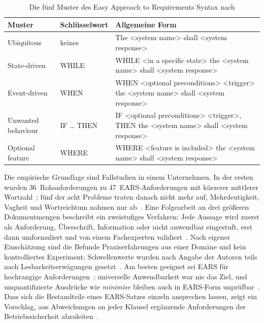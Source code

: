 \documentclass[11pt,a4paper]{report}
\begin{document}
\begin{table}[htbp]
  \centering
  \caption{Die fünf Muster des Easy Approach to Requirements Syntax
           nach \cite[Abschn.~4.2--4.6]{mavin2009ears}}
  \label{tab:ears-muster}
  \begin{tabular}{@{}>{\raggedright\arraybackslash}p{2.6cm}%
                    >{\raggedright\arraybackslash}p{2.0cm}%
                    >{\raggedright\arraybackslash}p{8.2cm}@{}}
    \toprule
    \textbf{Muster} & \textbf{Schlüssel\-wort} & \textbf{Allgemeine Form} \\
    \midrule
    Ubiquitous & keines &
      The \textless system name\textgreater{} shall
      \textless system response\textgreater \\
    State-driven & WHILE &
      WHILE \textless in a specific state\textgreater{} the
      \textless system name\textgreater{} shall
      \textless system response\textgreater \\
    Event-driven & WHEN &
      WHEN \textless optional preconditions\textgreater{}
      \textless trigger\textgreater{} the
      \textless system name\textgreater{} shall
      \textless system response\textgreater \\
    Unwanted behaviour & IF \dots{} THEN &
      IF \textless optional preconditions\textgreater{}
      \textless trigger\textgreater, THEN the
      \textless system name\textgreater{} shall
      \textless system response\textgreater \\
    Optional feature & WHERE &
      WHERE \textless feature is included\textgreater{} the
      \textless system name\textgreater{} shall
      \textless system response\textgreater \\
    \bottomrule
  \end{tabular}
\end{table}

Die empirische Grundlage sind Fallstudien in einem Unternehmen. In der
ersten wurden 36~Rohanforderungen zu 47~EARS-Anforderungen mit
kürzerer mittlerer Wortzahl~\cite[Tab.~2]{mavin2009ears}; fünf der
acht Probleme traten danach nicht mehr auf, Mehrdeutigkeit, Vagheit und
Wortreichtum nahmen nur ab~\cite[Abschn.~5]{mavin2009ears}. Eine
Folgearbeit an drei größeren Dokumentmengen beschreibt ein
zweistufiges Verfahren: Jede Aussage wird zuerst als Anforderung,
Überschrift, Information oder nicht anwendbar eingestuft, erst dann
umformuliert und von einem Fachexperten
validiert~\cite[Abschn.~Case Studies und Method]{mavin2010bigears}.
Nach eigener Einschätzung sind die Befunde Praxiserfahrungen aus
einer Domäne und kein kontrolliertes Experiment; Schwellenwerte wurden
nach Angabe der Autoren teils nach Lesbarkeitserwägungen
gesetzt~\cite[Abschn.~Testing the Hypothesis]{mavin2010bigears}. Am besten geeignet sei EARS für
hochrangige Anforderungen~\cite[Abschn.~2]{mavin2009ears}; universelle
Anwendbarkeit war nie das Ziel, und unquantifizierte Ausdrücke wie
\textit{minimise} bleiben auch in EARS-Form
unprüfbar~\cite[Abschn.~Discussion und Residual
Problems]{mavin2010bigears}. Dass sich die Bestandteile eines
EARS-Satzes einzeln ansprechen lassen, zeigt ein Vorschlag, aus
Abweichungen an jeder Klausel ergänzende Anforderungen der
Betriebssicherheit abzuleiten~\cite{wilkinson2018mitigation}.
\end{document}
